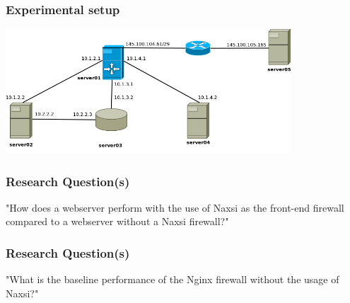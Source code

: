 \begin{frame}
  \frametitle{Experimental setup}
    \begin{center} 
      \includegraphics[width=0.80\textwidth]{../paper/images/infrastructure.png}
  \end{center}
\end{frame}


\begin{frame}
  \frametitle{Research Question(s)}
   \begin{center}
   \LARGE{"How does a webserver perform with the use of Naxsi as the front-end firewall
compared to a webserver without a Naxsi firewall?"}
  \end{center}
\end{frame}

\begin{frame}
  \frametitle{Research Question(s)}
   \begin{center}
   \LARGE{"What is the baseline performance of the Nginx firewall without the usage of Naxsi?"}
  \end{center}
\end{frame}
